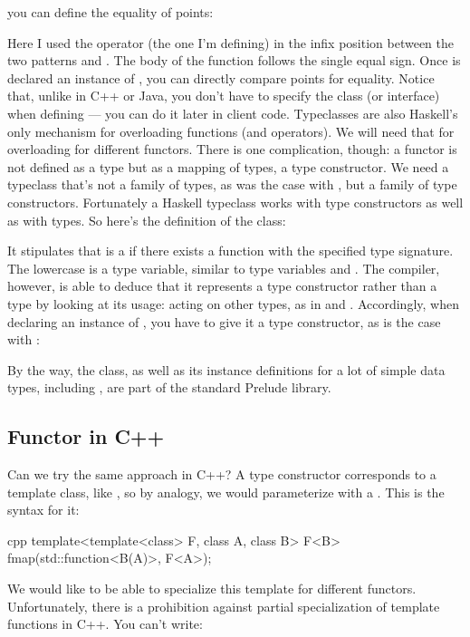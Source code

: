 you can define the equality of points:

Here I used the operator \code{(==)} (the one I'm defining) in the
infix position between the two patterns  and
. The body of the function follows the
single equal sign. Once  is declared an instance of
, you can directly compare points for equality. Notice that,
unlike in C++ or Java, you don't have to specify the  class
(or interface) when defining  --- you can do it later in
client code. Typeclasses are also Haskell's only mechanism for
overloading functions (and operators). We will need that for overloading
 for different functors. There is one complication, though:
a functor is not defined as a type but as a mapping of types, a type
constructor. We need a typeclass that's not a family of types, as was
the case with , but a family of type constructors.
Fortunately a Haskell typeclass works with type constructors as well as
with types. So here's the definition of the  class:

It stipulates that  is a  if there exists a
function  with the specified type signature. The lowercase
 is a type variable, similar to type variables  and
. The compiler, however, is able to deduce that it represents
a type constructor rather than a type by looking at its usage: acting on
other types, as in  and . Accordingly, when
declaring an instance of , you have to give it a type
constructor, as is the case with :

By the way, the  class, as well as its instance
definitions for a lot of simple data types, including ,
are part of the standard Prelude library.

\subsection{Functor in C++}

Can we try the same approach in C++? A type constructor corresponds to a
template class, like , so by analogy, we would
parameterize  with a 
. This is the syntax for it:

\begin{snip}{cpp}
template<template<class> F, class A, class B>
F<B> fmap(std::function<B(A)>, F<A>);
\end{snip}
We would like to be able to specialize this template for different
functors. Unfortunately, there is a prohibition against partial
specialization of template functions in C++. You can't write:

